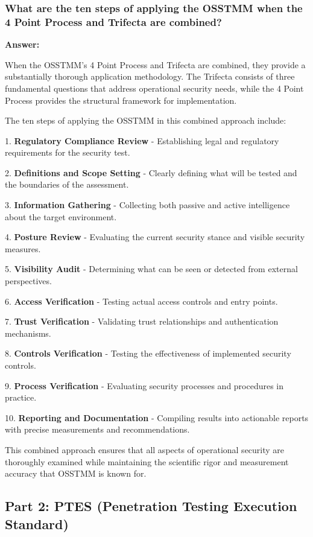 \documentclass[12pt,a4paper]{article}
\begin{document}
\subsubsection{What are the ten steps of applying the OSSTMM when the 4 Point Process and Trifecta are combined?}

\textbf{Answer:}

When the OSSTMM's 4 Point Process and Trifecta are combined, they provide a substantially thorough application methodology. The Trifecta consists of three fundamental questions that address operational security needs, while the 4 Point Process provides the structural framework for implementation.

The ten steps of applying the OSSTMM in this combined approach include:

1. \textbf{Regulatory Compliance Review} - Establishing legal and regulatory requirements for the security test.

2. \textbf{Definitions and Scope Setting} - Clearly defining what will be tested and the boundaries of the assessment.

3. \textbf{Information Gathering} - Collecting both passive and active intelligence about the target environment.

4. \textbf{Posture Review} - Evaluating the current security stance and visible security measures.

5. \textbf{Visibility Audit} - Determining what can be seen or detected from external perspectives.

6. \textbf{Access Verification} - Testing actual access controls and entry points.

7. \textbf{Trust Verification} - Validating trust relationships and authentication mechanisms.

8. \textbf{Controls Verification} - Testing the effectiveness of implemented security controls.

9. \textbf{Process Verification} - Evaluating security processes and procedures in practice.

10. \textbf{Reporting and Documentation} - Compiling results into actionable reports with precise measurements and recommendations.

This combined approach ensures that all aspects of operational security are thoroughly examined while maintaining the scientific rigor and measurement accuracy that OSSTMM is known for.

\subsection{Part 2: PTES (Penetration Testing Execution Standard)}
\end{document}
